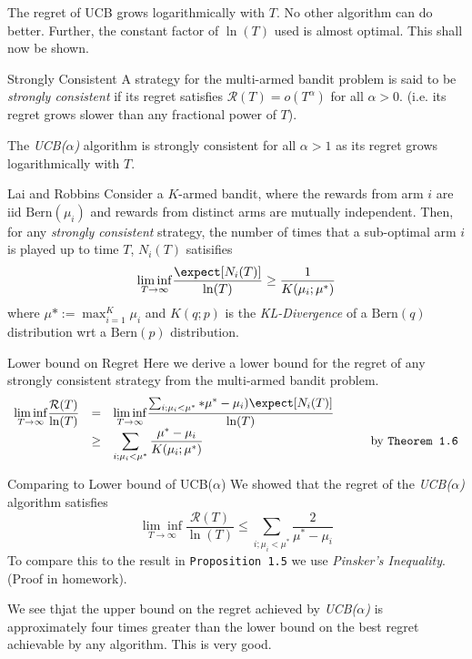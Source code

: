 \documentclass[11pt,a4paper]{article}
\begin{document}
\begin{remark}{The regret of UCB grows logarithmically with $T$. No other algorithm can do better.}
  Further, the constant factor of $\ln(T)$ used is almost optimal. This shall now be shown.
\end{remark}

\begin{definition}{Strongly Consistent}
  A strategy for the multi-armed bandit problem is said to be \textit{strongly consistent} if its regret satisfies $\mathcal{R}(T)=o(T^\alpha)$ for all $\alpha>0$. (i.e. its regret grows slower than any fractional power of $T$).
  \par The \textit{UCB($\alpha$)} algorithm is strongly consistent for all $\alpha>1$ as its regret grows logarithmically with $T$.
\end{definition}

\begin{theorem}{Lai and Robbins}
  Consider a $K$-armed bandit, where the rewards from arm $i$ are iid $\text{Bern}(\mu_i)$ and rewards from distinct arms are mutually independent. Then, for any \textit{strongly consistent} strategy, the number of times that a sub-optimal arm $i$ is played up to time $T$, $N_i(T)$ satisifies
  \[ \underset{T\to\infty}{\lim\inf}\frac{\expect[N_i(T)]}{\ln(T)}\geq\frac1{K(\mu_i;\mu^*)} \]
  where $\mu*:=\max_{i=1}^K\mu_i$ and $K(q;p)$ is the \textit{KL-Divergence} of a $\text{Bern}(q)$ distribution wrt a $\text{Bern}(p)$ distribution.
\end{theorem}

\begin{proposition}{Lower bound on Regret}
  Here we derive a lower bound for the regret of any strongly consistent strategy from the multi-armed bandit problem.
  \[\begin{array}{rclcl}
  \underset{T\to\infty}{\lim\inf}\dfrac{\mathcal{R}(T)}{\ln(T)}&=&\underset{T\to\infty}{\lim\inf}\dfrac{\sum_{i;\mu_i<\mu^*}*\mu^*-\mu_i)\expect[N_i(T)]}{\ln(T)}&\quad&\\
  &\geq&\displaystyle\sum_{i;\mu_i<\mu^*}\frac{\mu^*-\mu_i}{K(\mu_i;\mu^*)}&&\text{by \texttt{Theorem 1.6}}
  \end{array}\]
\end{proposition}

\begin{proposition}{Comparing to Lower bound of UCB($\alpha$)}
  We showed that the regret of the \textit{UCB($\alpha$)} algorithm satisfies
  \[ \underset{T\to\infty}{\lim\inf}\frac{\mathcal{R}(T)}{\ln(T)}\leq\sum_{i;\mu_i<\mu^*}\frac2{\mu^*-\mu_i} \]
  To compare this to the result in \texttt{Proposition 1.5} we use \textit{Pinsker's Inequality}. (Proof in homework).
  \par We see thjat the upper bound on the regret achieved by \textit{UCB($\alpha$)} is approximately four times greater than the lower bound on the best regret achievable by any algorithm. This is very good.
\end{proposition}
\end{document}
